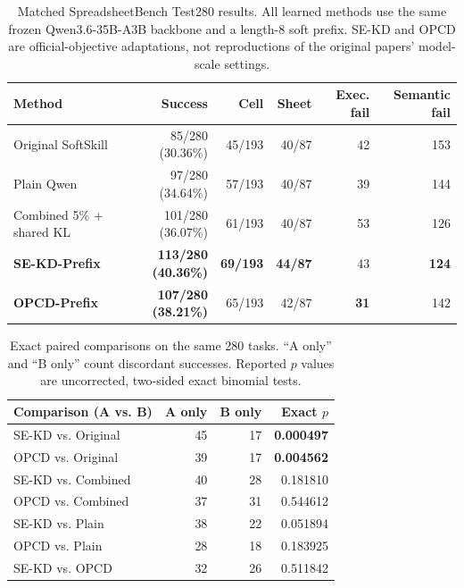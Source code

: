 
\begin{table}[t]
  \centering
  \small
  \caption{Matched SpreadsheetBench Test280 results. All learned methods use
  the same frozen Qwen3.6-35B-A3B backbone and a length-8 soft prefix. SE-KD
  and OPCD are official-objective adaptations, not reproductions of the
  original papers' model-scale settings.}
  \label{tab:official-prefix-test280}
  \begin{tabular}{lrrrrr}
    \toprule
    Method & Success & Cell & Sheet & Exec. fail & Semantic fail \\
    \midrule
    Original SoftSkill & 85/280 (30.36\%) & 45/193 & 40/87 & 42 & 153 \\
    Plain Qwen & 97/280 (34.64\%) & 57/193 & 40/87 & 39 & 144 \\
    Combined 5\% + shared KL & 101/280 (36.07\%) & 61/193 & 40/87 & 53 & 126 \\
    \textbf{SE-KD-Prefix} & \textbf{113/280 (40.36\%)} & \textbf{69/193} & \textbf{44/87} & 43 & \textbf{124} \\
    \textbf{OPCD-Prefix} & \textbf{107/280 (38.21\%)} & 65/193 & 42/87 & \textbf{31} & 142 \\
    \bottomrule
  \end{tabular}
\end{table}

\begin{table}[t]
  \centering
  \small
  \caption{Exact paired comparisons on the same 280 tasks. ``A only'' and
  ``B only'' count discordant successes. Reported $p$ values are uncorrected,
  two-sided exact binomial tests.}
  \label{tab:official-prefix-paired}
  \begin{tabular}{lrrr}
    \toprule
    Comparison (A vs. B) & A only & B only & Exact $p$ \\
    \midrule
    SE-KD vs. Original & 45 & 17 & \textbf{0.000497} \\
    OPCD vs. Original & 39 & 17 & \textbf{0.004562} \\
    SE-KD vs. Combined & 40 & 28 & 0.181810 \\
    OPCD vs. Combined & 37 & 31 & 0.544612 \\
    SE-KD vs. Plain & 38 & 22 & 0.051894 \\
    OPCD vs. Plain & 28 & 18 & 0.183925 \\
    SE-KD vs. OPCD & 32 & 26 & 0.511842 \\
    \bottomrule
  \end{tabular}
\end{table}

